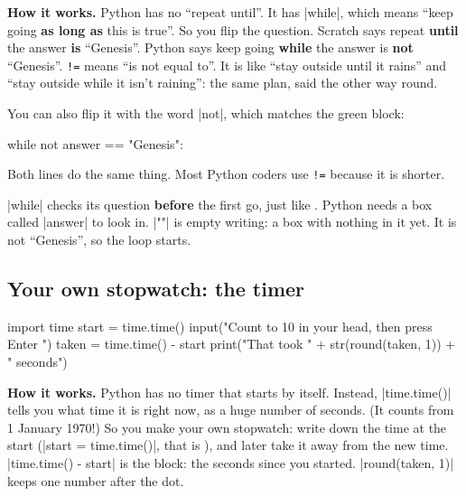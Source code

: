 \textbf{How it works.} Python has no ``repeat until''. It has \py|while|, which means ``keep going \textbf{as long as} this is true''. So you flip the question. Scratch says repeat \textbf{until} the answer \textbf{is} ``Genesis''. Python says keep going \textbf{while} the answer is \textbf{not} ``Genesis''. \texttt{!=} means ``is not equal to''. It is like ``stay outside until it rains'' and ``stay outside while it isn't raining'': the same plan, said the other way round.

You can also flip it with the word \py|not|, which matches the green  block:
\begin{codenonum}
while not answer == "Genesis":
\end{codenonum}
Both lines do the same thing. Most Python coders use \texttt{!=} because it is shorter.

\begin{think}[Why \texttt{answer = ""} on line 1?]
\py|while| checks its question \textbf{before} the first go, just like . Python needs a box called \py|answer| to look in. \py|""| is empty writing: a box with nothing in it yet. It is not ``Genesis'', so the loop starts.
\end{think}

\subsection*{Your own stopwatch: the timer}

\begin{center}
\begin{scratch}
\end{scratch}
\end{center}
\vspace{-4pt}
\begin{code}
import time
start = time.time()
input("Count to 10 in your head, then press Enter ")
taken = time.time() - start
print("That took " + str(round(taken, 1)) + " seconds")
\end{code}

\textbf{How it works.} Python has no timer that starts by itself. Instead, \py|time.time()| tells you what time it is right now, as a huge number of seconds. (It counts from 1 January 1970!) So you make your own stopwatch: write down the time at the start (\py|start = time.time()|, that is ), and later take it away from the new time. \py|time.time() - start| is the  block: the seconds since you started. \py|round(taken, 1)| keeps one number after the dot.

